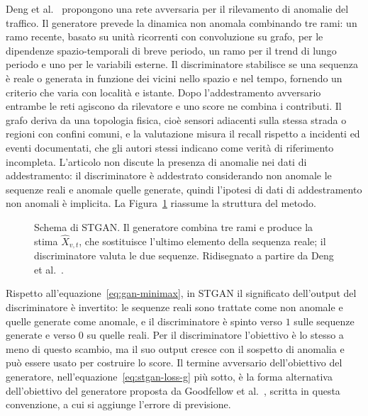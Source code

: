 Deng et al.~\cite{deng2022stgan} propongono una rete avversaria per il rilevamento di anomalie del traffico. Il generatore prevede la dinamica non anomala combinando tre rami: un ramo recente, basato su unità ricorrenti con convoluzione su grafo, per le dipendenze spazio-temporali di breve periodo, un ramo per il trend di lungo periodo e uno per le variabili esterne. Il discriminatore stabilisce se una sequenza è reale o generata in funzione dei vicini nello spazio e nel tempo, fornendo un criterio che varia con località e istante. Dopo l'addestramento avversario entrambe le reti agiscono da rilevatore e uno score ne combina i contributi. Il grafo deriva da una topologia fisica, cioè sensori adiacenti sulla stessa strada o regioni con confini comuni, e la valutazione misura il recall rispetto a incidenti ed eventi documentati, che gli autori stessi indicano come verità di riferimento incompleta. L'articolo non discute la presenza di anomalie nei dati di addestramento: il discriminatore è addestrato considerando non anomale le sequenze reali e anomale quelle generate, quindi l'ipotesi di dati di addestramento non anomali è implicita. La Figura~\ref{fig:schema-stgan} riassume la struttura del metodo.

\begin{figure}[htbp]
    \centering
    
    \caption{Schema di STGAN. Il generatore combina tre rami e produce la stima $\hat{X}_{v,t}$, che sostituisce l'ultimo elemento della sequenza reale; il discriminatore valuta le due sequenze. Ridisegnato a partire da Deng et al.~\cite{deng2022stgan}.}
    \label{fig:schema-stgan}
\end{figure}

Rispetto all'equazione~\eqref{eq:gan-minimax}, in STGAN il significato dell'output del discriminatore è invertito: le sequenze reali sono trattate come non anomale e quelle generate come anomale, e il discriminatore è spinto verso $1$ sulle sequenze generate e verso $0$ su quelle reali. Per il discriminatore l'obiettivo è lo stesso a meno di questo scambio, ma il suo output cresce con il sospetto di anomalia e può essere usato per costruire lo score. Il termine avversario dell'obiettivo del generatore, nell'equazione~\eqref{eq:stgan-loss-g} più sotto, è la forma alternativa dell'obiettivo del generatore proposta da Goodfellow et al.~\cite{goodfellow2014gan}, scritta in questa convenzione, a cui si aggiunge l'errore di previsione.

